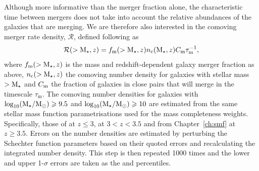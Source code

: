 Although more informative than the merger fraction alone, the characteristic time between mergers does not take into account the relative abundances of the galaxies that are merging. We are therefore also interested in the comoving merger rate density, $\mathcal{R}$, defined following \citet{Lin:2004ki} as
\begin{equation}\label{eq:merger_rate}
	\mathcal{R}(>\text{M}_{\star}, z) = f_{\text{m}}(>\text{M}_{\star}, z)n_{\text{c}}(\text{M}_{\star}, z) C_{\rm{m}}\tau_{\text{m}}^{-1},
\end{equation}
where $f_{\text{m}}(>\text{M}_{\star}, z)$ is the mass and redshift-dependent galaxy merger fraction as above, $n_{\text{c}}(>\text{M}_{\star}, z)$ the comoving number density for galaxies with stellar mass $>\text{M}_{\star}$ and $C_{\rm{m}}$ the fraction of galaxies in close pairs that will merge in the timescale $\tau_{\text{m}}$. The comoving number densities for galaxies with $\log_{10}(\text{M}_{\star} / \text{M}_{\odot}) \geqslant 9.5$ and $\log_{10}(\text{M}_{\star} / \text{M}_{\odot}) \geqslant 10$ are estimated from the same stellar mass function parametrisations used for the mass completeness weights. Specifically, those of \citet{Mortlock:2014et} at $z \leq 3$, \citet{Santini:2012jq} at $3 < z < 3.5$ and from Chapter~\ref{ch:smf} at $z \geq 3.5$. Errors on the number densities are estimated by perturbing the Schechter function parameters based on their quoted errors and recalculating the integrated number density. This step is then repeated 1000 times and the lower and upper 1-$\sigma$ errors are taken as the  and  percentiles.

